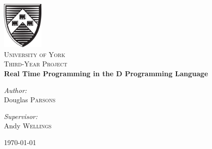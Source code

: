 \begin{titlepage}
\begin{center}

\includegraphics[width=0.15\textwidth]{./logo}~\\[1cm]

\textsc{\LARGE University of York}\\[1.5cm]

\textsc{\Large Third-Year Project}\\[0.5cm]

\HRule{\\[0.4cm]}
{\huge\bfseries{Real Time Programming in the D Programming Language}\\[0.4cm] }

\HRule{\\[1.5cm]}

\noindent
\begin{minipage}[t]{0.4\textwidth}
\begin{flushleft} \large
\emph{Author:}\\
Douglas \textsc{Parsons}
\end{flushleft}
\end{minipage}
\begin{minipage}[t]{0.4\textwidth}
\begin{flushright} \large
\emph{Supervisor:} \\
Andy \textsc{Wellings}
\end{flushright}
\end{minipage}

\vfill

{\large \today}

\end{center}
\end{titlepage}
